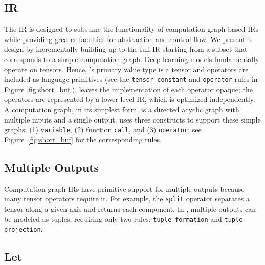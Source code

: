   \subsection{IR}
  

  The \relay IR is designed
    to subsume the functionality of computation graph-based IRs
    while providing greater faculties for abstraction and control flow.
  We present \relay's design by incrementally building up to the full IR
    starting from a subset that corresponds to a simple computation graph.
  Deep learning models fundamentally operate on tensors.
  Hence, \relay's primary value type is a tensor and operators are included as language primitives
    (see the \verb|tensor constant| and \verb|operator| rules in Figure \ref{fig:short_bnf}).
  \relay leaves the implementation of each operator opaque; the operators
    are represented by a lower-level IR, which is optimized independently.
  A computation graph, in its simplest form, is a directed acyclic
    graph with multiple inputs and a single output.
  \relay uses three constructs to support these simple graphs:
    (1) \verb|variable|, (2) function \verb|call|,
    and (3) \verb|operator|; see Figure~\ref{fig:short_bnf} for the corresponding rules.

  \subsection*{Multiple Outputs}

  Computation graph IRs have primitive support for multiple outputs
    because many tensor operators require it.
  For example, the \verb|split| operator separates a tensor along a given axis
    and returns each component.
  In \relay, multiple outputs can be modeled as tuples,
    requiring only two rules: \verb|tuple formation| and \verb|tuple projection|.

  \subsection*{Let}

